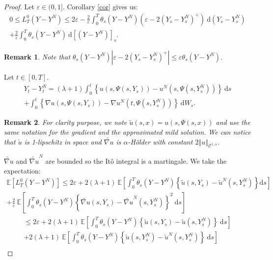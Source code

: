 \documentclass[12pt]{article}
\newtheorem{rem}{Remark}
\newcommand{\norme}[1]{\left\Vert #1\right\Vert}
\newcommand{\E}{\mathbb{E}}
\newcommand{\di}{\mathrm{d}}
\begin{document}
\begin{proof}
    Let $\varepsilon\in(0,1]$. Corollary \ref{cor} gives us:    
    \begin{multline*}
    0\leq L^0_T(Y-Y^N) \leq 2\varepsilon - \frac{2}{\varepsilon}\int_0^T \theta_s(Y-Y^N) \left(\varepsilon - 2{(Y_s-Y_s^N)^+}\right)\ \di (Y_s-Y_s^N)\\
    +\frac{2}{\varepsilon}\int_0^T \theta_s(Y-Y^N) \ \di[(Y-Y^N)]_s.
    \end{multline*}    
    \begin{rem}
        Note that $\theta_s(Y-Y^N) \left|\varepsilon - 2{(Y_s-Y_s^N)^+}\right|\leq \varepsilon\theta_s(Y-Y^N)$.
    \end{rem}
Let $t\in[0,T]$.
\begin{multline*}
Y_t-Y_t^N = (\lambda + 1 )\int_0^t\left\{u\left(s,\Psi\left(s,Y_s\right)\right)-u^N\left(s,\Psi\left(s,Y_s^N\right)\right)\right\}\ \di s\\ + \int_0^t\left\{\nabla u\left(s,\Psi\left(s,Y_s\right)\right)-\nabla u^N\left(t,\Psi\left(s,Y_s^N\right)\right)\right\}\ \di W_s.
\end{multline*}
\begin{rem}  
    For clarity purpose, we note $\tilde{u}\left(s,x\right) = u\left(s,\Psi\left(s,x\right)\right)$ and use the same notation for the gradient and the approximated mild solution. We can notice that $\tilde{u}$ is 1-lipschitz in space and $\widetilde{\nabla u}$ is $\alpha$-Hölder with constant $2\norme{u}_{\mathcal{C}^{1,\alpha}}$.
\end{rem}
$\widetilde{\nabla u}$ and $\widetilde{\nabla u}^N$ are bounded so the Itô integral is a martingale. We take the expectation:
    \begin{multline*}
    \E\left[L^0_T(Y-Y^N)\right] \leq 2\varepsilon + 2(\lambda + 1)\ \E\left[\int_0^T\theta_s(Y-Y^N)\left\{\tilde{u}\left(s,Y_s\right)-\tilde{u}^N\left(s,Y_s^N\right)\right\} \di s \right]\\
    +\frac{2}{\varepsilon}\ \E\left[\int_0^T \theta_s(Y-Y^N)\left\{\widetilde{\nabla u}\left(s,Y_s\right)-\widetilde{\nabla u}^N\left(s,Y_s^N\right)\right\}^2\ \di s\right]
    \end{multline*}
    \begin{multline*}
    \leq 2\varepsilon + 2(\lambda + 1)\ \E\left[\int_0^T\theta_s(Y-Y^N)\left\{\tilde{u}\left(s,Y_s\right)-\tilde{u}\left(s,Y_s^N\right)\right\}\ \di s \right]\\+2(\lambda + 1)\ \E\left[\int_0^T\theta_s(Y-Y^N)\left\{\tilde{u}\left(s,Y_s^N\right)-\tilde{u}^N\left(s,Y_s^N\right)\right\}\ \di s \right]\\

\end{multline*}
\end{proof}
\end{document}
